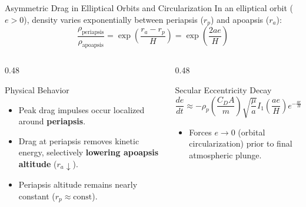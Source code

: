 \documentclass[aspectratio=169,11pt]{beamer}
\begin{document}
\begin{frame}{Asymmetric Drag in Elliptical Orbits and Circularization}
    In an elliptical orbit ($e > 0$), density varies exponentially between periapsis ($r_p$) and apoapsis ($r_a$):
    \begin{equation*}
        \frac{\rho_{\text{periapsis}}}{\rho_{\text{apoapsis}}} = \exp\left( \frac{r_a - r_p}{H} \right) = \exp\left( \frac{2 a e}{H} \right)
    \end{equation*}

    \begin{columns}[t]
        \begin{column}{0.48\textwidth}
            \begin{block}{Physical Behavior}
                \begin{itemize}
                    \item Peak drag impulses occur localized around \textbf{periapsis}.
                    \item Drag at periapsis removes kinetic energy, selectively \textbf{lowering apoapsis altitude} ($r_a \downarrow$).
                    \item Periapsis altitude remains nearly constant ($r_p \approx \text{const}$).
                \end{itemize}
            \end{block}
        \end{column}

        \begin{column}{0.48\textwidth}
            \begin{block}{Secular Eccentricity Decay}
                \begin{equation*}
                    \frac{de}{dt} \approx -\rho_p \left(\frac{C_D A}{m}\right) \sqrt{\frac{\mu}{a}} I_1\left(\frac{ae}{H}\right) e^{-\frac{ae}{H}}
                \end{equation*}
                \begin{itemize}
                    \item Forces $e \to 0$ (orbital circularization) prior to final atmospheric plunge.
                \end{itemize}
            \end{block}
        \end{column}
    \end{columns}
\end{frame}
\end{document}
